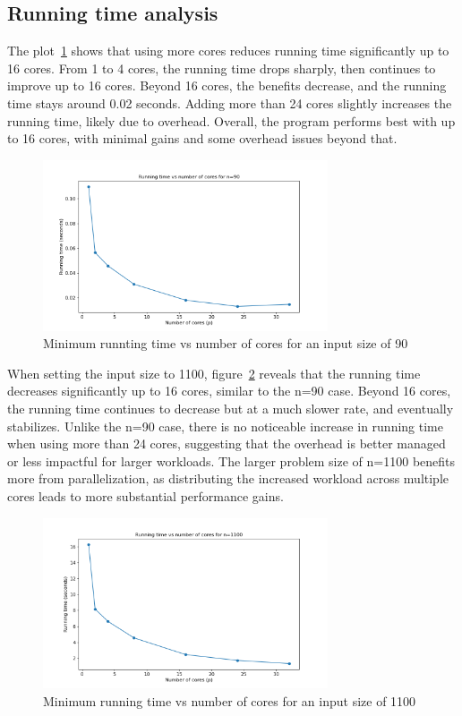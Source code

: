 \documentclass[a4paper,%
7pt,%
DIV12,
headsepline,%
headings=normal,
]{scrartcl}
\begin{document}
\subsection{Running time analysis}

The plot~\ref{fig:juliap_job_90} shows that using more cores reduces running time significantly up to 16 cores. From 1 to 4 cores, the running time drops sharply, then continues to improve up to 16 cores. Beyond 16 cores, the benefits decrease, and the running time stays around 0.02 seconds. Adding more than 24 cores slightly increases the running time, likely due to overhead. Overall, the program performs best with up to 16 cores, with minimal gains and some overhead issues beyond that.

\begin{figure}[htbp]
    \centering
    \includegraphics[width=0.75\textwidth]{./juliap_job_90.png}
    \caption{Minimum runnting time vs number of cores for an input size of 90}
    \label{fig:juliap_job_90}
\end{figure}

\newpage
When setting the input size to 1100, figure~\ref{fig:juliap_job_1100} reveals that the running time decreases significantly up to 16 cores, similar to the n=90 case. Beyond 16 cores, the running time continues to decrease but at a much slower rate, and eventually stabilizes. Unlike the n=90 case, there is no noticeable increase in running time when using more than 24 cores, suggesting that the overhead is better managed or less impactful for larger workloads. The larger problem size of n=1100 benefits more from parallelization, as distributing the increased workload across multiple cores leads to more substantial performance gains.

\begin{figure}[htbp]
    \centering
    \includegraphics[width=0.75\textwidth]{./juliap_job_1100.png}
    \caption{Minimum running time vs number of cores for an input size of 1100}
    \label{fig:juliap_job_1100}
\end{figure}
\end{document}
